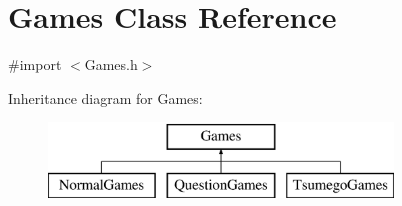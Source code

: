 \hypertarget{interface_games}{
\section{Games Class Reference}
\label{interface_games}
}


{\ttfamily \#import $<$Games.h$>$}

Inheritance diagram for Games:\begin{figure}[H]
\begin{center}
\leavevmode
\includegraphics[height=2.000000cm]{interface_games}
\end{center}
\end{figure}
